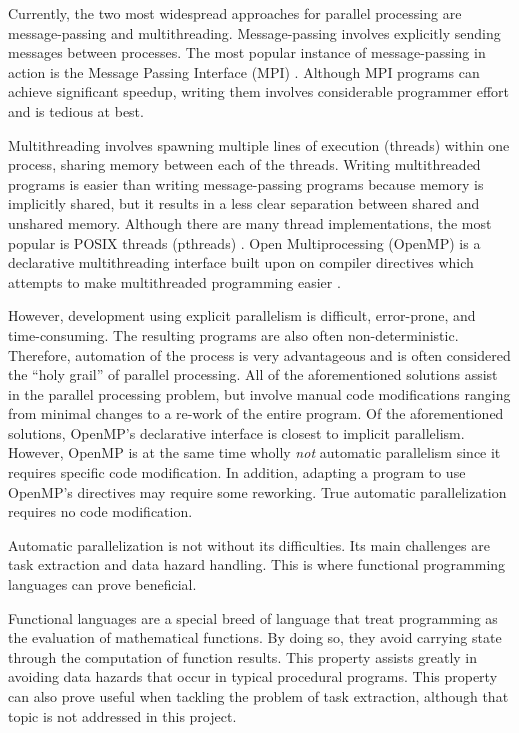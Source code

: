 \documentclass[abstracton]{scrartcl}
\begin{document}
Currently, the two most widespread approaches for parallel processing are message-passing and multithreading. Message-passing involves explicitly sending messages between processes. The most popular instance of message-passing in action is the Message Passing Interface (MPI) \autocite{gabriel04:_open_mpi}. Although MPI programs can achieve significant speedup, writing them involves considerable programmer effort and is tedious at best.

Multithreading involves spawning multiple lines of execution (threads) within one process, sharing memory between each of the threads. Writing multithreaded programs is easier than writing message-passing programs because memory is implicitly shared, but it results in a less clear separation between shared and unshared memory. Although there are many thread implementations, the most popular is POSIX threads (pthreads) \autocite{pthreads}. Open Multiprocessing (OpenMP) is a declarative multithreading interface built upon on compiler directives which attempts to make multithreaded programming easier \autocite{openmp-specs}.

However, development using explicit parallelism is difficult, error-prone, and time-consuming. The resulting programs are also often non-deterministic. Therefore, automation of the process is very advantageous and is often considered the ``holy grail'' of parallel processing. All of the aforementioned solutions assist in the parallel processing problem, but involve manual code modifications ranging from minimal changes to a re-work of the entire program. Of the aforementioned solutions, OpenMP's declarative interface is closest to implicit parallelism. However, OpenMP is at the same time wholly \emph{not} automatic parallelism since it requires specific code modification. In addition, adapting a program to use OpenMP's directives may require some reworking. True automatic parallelization requires no code modification.

Automatic parallelization is not without its difficulties. Its main challenges are task extraction and data hazard handling. This is where functional programming languages can prove beneficial.

Functional languages are a special breed of language that treat programming as the evaluation of mathematical functions. By doing so, they avoid carrying state through the computation of function results. This property assists greatly in avoiding data hazards that occur in typical procedural programs. This property can also prove useful when tackling the problem of task extraction, although that topic is not addressed in this project.
\end{document}
